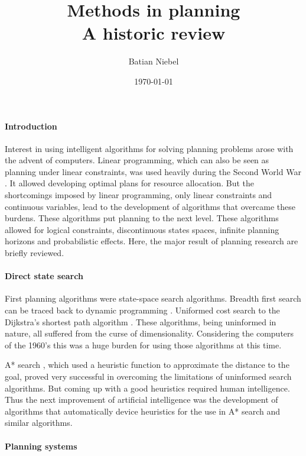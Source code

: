 \documentclass{article}
\begin{document}
\title{Methods in planning  \\ A historic review}
\author{Batian Niebel}
\date{\today}

\maketitle

\paragraph*{Introduction}

Interest in using intelligent algorithms for solving planning problems arose
with the advent of computers. Linear programming, which can also be seen as
planning under linear constraints, was used heavily during the Second World War
\cite{linearprog}. It allowed developing optimal plans for resource allocation.
But the shortcomings imposed by linear programming, only linear
constraints and continuous variables, lead to the development of
algorithms that overcame these burdens. These algorithms put planning to the
next level. These algorithms allowed for logical constraints,
discontinuous states spaces, infinite planning horizons and probabilistic
effects. Here, the major result of planning research are briefly reviewed.

\paragraph*{Direct state search}

First planning algorithms were state-space search algorithms. Breadth first
search can be traced back to dynamic programming \cite{bellman}. Uniformed cost
search to the Dijkstra's shortest path algorithm \cite{cormen}. These
algorithms, being uninformed in nature, all suffered from the curse of
dimensionality. Considering the computers of the 1960's this was a huge burden
for using those algorithms at this time.

A* search \cite{a_star}, which used a heuristic function to approximate the
distance to the goal, proved very successful in overcoming the limitations of 
uninformed search algorithms. But coming up with a good heuristics required
human intelligence. Thus the next improvement of artificial intelligence was the
development of algorithms that automatically device heuristics for the use in
A* search and similar algorithms.

\paragraph*{Planning systems}
\end{document}
